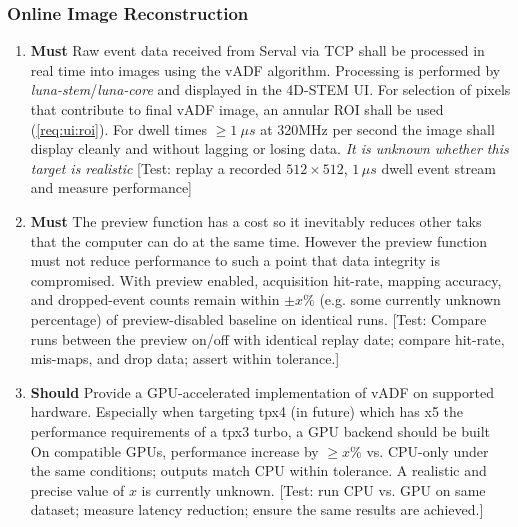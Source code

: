 \documentclass[10pt]{article}
\newcommand{\PriorityTag}[2]{%
  \colorbox{#2!25}{\footnotesize\textsf{\textbf{#1}}}\hspace{0.6em}}
\newcommand{\must}{\leavevmode\PriorityTag{Must}{green}}
\newcommand{\should}{\leavevmode\PriorityTag{Should}{yellow}}
\newcounter{reqgrp}[section] %
\newcounter{reqno}
\newcommand{\reqprefix}{GEN}
\newenvironment{requirements}[1]{%
  \renewcommand{\reqprefix}{#1}%
  \refstepcounter{reqgrp}%
  \setcounter{reqno}{0}%
  \begin{enumerate}[leftmargin=*]
}{\end{enumerate}}
\begin{document}
\subsubsection{Online Image Reconstruction}
\begin{requirements}{OIR}

\item \must {}
  {Raw event data received from Serval via TCP shall be processed in real time into images using the vADF algorithm. Processing is performed by \emph{luna-stem}/\emph{luna-core} and displayed in the 4D-STEM UI. For selection of pixels that contribute to final vADF image, an annular ROI shall be used (\cref{req:ui:roi})}.
  {For dwell times \(\ge 1\ \mu s\) at 320MHz per second the image shall display cleanly and without lagging or losing data. \textit{It is unknown whether this target is realistic}}
  [Test: replay a recorded \(512\times512\), \(1\,\mu s\) dwell event stream and measure performance]

\item \must {}
  {The preview function has a cost so it inevitably reduces other taks that the computer can do at the same time. However the preview function must not reduce performance to such a point that data integrity is compromised.}
  {With preview enabled, acquisition hit-rate, mapping accuracy, and dropped-event counts remain within \(\pm x\%\) (e.g. some currently unknown percentage) of preview-disabled baseline on identical runs.}
  [Test: Compare runs between the preview on/off with identical replay date; compare hit-rate, mis-maps, and drop data; assert within tolerance.]

\item \should {}
  {Provide a GPU-accelerated implementation of vADF on supported hardware. Especially when targeting tpx4 (in future) which has x5 the performance requirements of a tpx3 turbo, a GPU backend should be built}
  {On compatible GPUs, performance increase by \(\ge x\%\) vs. CPU-only under the same conditions; outputs match CPU within tolerance. A realistic and precise value of \(x\) is currently unknown. }
  [Test: run CPU vs. GPU on same dataset; measure latency reduction; ensure the same results are achieved.]

\end{requirements}
\end{document}
